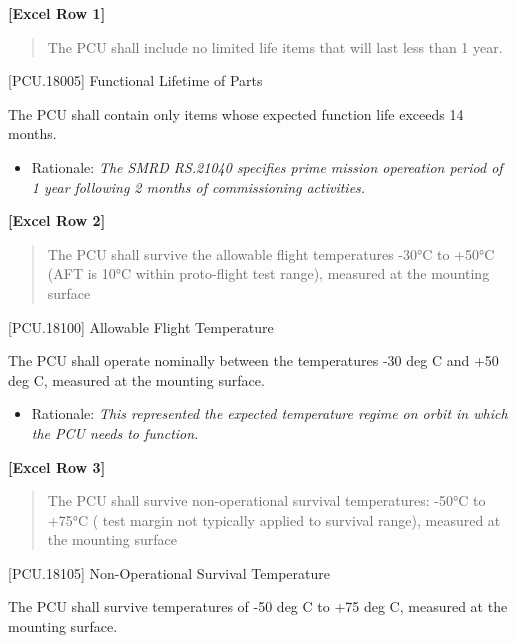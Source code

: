 
\def\myauthor{Craig Hutchinson}
\def\mytitle{Flow-down of LASP PCU requirements to PCU-ID}
\def\mydate{02 April 2018}


\textbf{[Excel Row 1]}

\begin{quote}
The PCU shall include no limited life items that will last less than 1 year.
\end{quote}

[PCU.18005] Functional Lifetime of Parts

The PCU shall contain only items whose expected function life exceeds 14 months.

\begin{itemize}
\item{} Rationale: \emph{The SMRD RS.21040 specifies prime mission opereation period of 1 year following 2 months of commissioning activities.}

\end{itemize}

\textbf{[Excel Row 2]}

\begin{quote}
The PCU shall survive the allowable flight temperatures -30°C to +50°C (AFT is 10°C within proto-flight test range), measured at the mounting surface
\end{quote}

[PCU.18100] Allowable Flight Temperature

The PCU shall operate nominally between the temperatures -30 deg C and +50 deg C, measured at the mounting surface.

\begin{itemize}
\item{} Rationale: \emph{This represented the expected temperature regime on orbit in which the PCU needs to function.}

\end{itemize}

\textbf{[Excel Row 3]}

\begin{quote}
The PCU shall survive non-operational survival temperatures: -50°C to +75°C ( test margin not typically applied to survival range), measured at the mounting surface
\end{quote}

[PCU.18105] Non-Operational Survival Temperature

The PCU shall survive temperatures of -50 deg C to +75 deg C, measured at the mounting surface.

